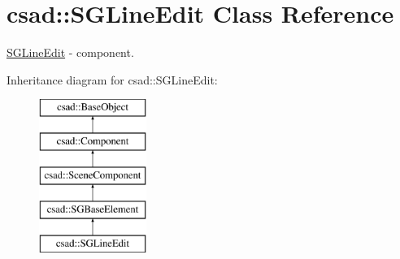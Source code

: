 \hypertarget{classcsad_1_1_s_g_line_edit}{\section{csad\-:\-:S\-G\-Line\-Edit Class Reference}
\label{classcsad_1_1_s_g_line_edit}
}


\hyperlink{classcsad_1_1_s_g_line_edit}{S\-G\-Line\-Edit} -\/ component.  


Inheritance diagram for csad\-:\-:S\-G\-Line\-Edit\-:\begin{figure}[H]
\begin{center}
\leavevmode
\includegraphics[height=5.000000cm]{classcsad_1_1_s_g_line_edit}
\end{center}
\end{figure}
